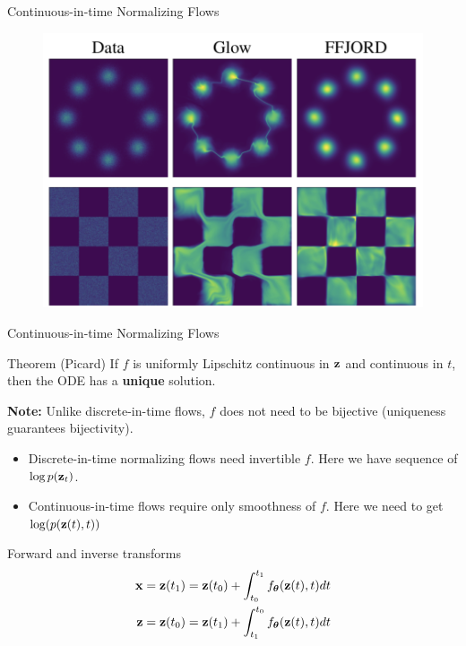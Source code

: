 \begin{frame}{Continuous-in-time Normalizing Flows}
\begin{minipage}[t]{0.6\columnwidth}
\begin{figure}
			\centering
			\includegraphics[width=0.8\linewidth]{figs/ffjord.png}
		\end{figure}
	\end{minipage}
\end{frame}
\begin{frame}{Continuous-in-time Normalizing Flows}
	\begin{block}{Theorem (Picard)}
		If $f$ is uniformly Lipschitz continuous in $\mathbf{z}$ and continuous in $t$, then the ODE has a \textbf{unique} solution.
	\end{block}
	\textbf{Note:} Unlike discrete-in-time flows, $f$ does not need to be bijective (uniqueness guarantees bijectivity).
	\begin{itemize}
		\item Discrete-in-time normalizing flows need invertible $f$. Here we have sequence of $\log p(\mathbf{z}_t)$.
		\item Continuous-in-time flows require only smoothness of $f$. Here we need to get $\log(p(\mathbf{z}(t), t))$
	\end{itemize}
	\begin{block}{Forward and inverse transforms}
		\vspace{-0.7cm}
		\begin{align*}
			\mathbf{x} &= \mathbf{z}(t_1) = \mathbf{z}(t_0) + \int_{t_0}^{t_1} f_{\boldsymbol{\theta}}(\mathbf{z}(t), t) dt \\
			\mathbf{z} &= \mathbf{z}(t_0) = \mathbf{z}(t_1) + \int_{t_1}^{t_0} f_{\boldsymbol{\theta}}(\mathbf{z}(t), t) dt
		\end{align*}
		\vspace{-0.7cm}
	\end{block}
\end{frame}
